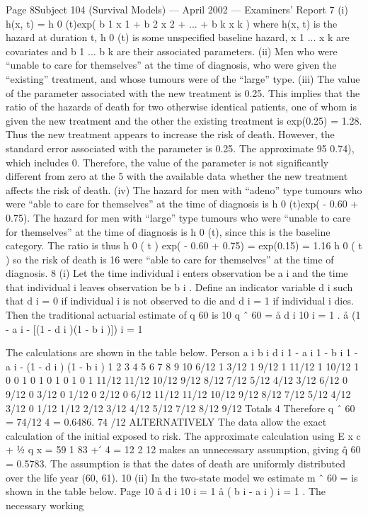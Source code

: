 \documentclass[a4paper,12pt]{article}
\begin{document}
\begin{enumerate}
Page 8Subject 104 (Survival Models) — April 2002 — Examiners’ Report
7
(i) h(x, t) = h 0 (t)exp( b 1 x 1 + b 2 x 2 + ... + b k x k )
where h(x, t) is the hazard at duration t, h 0 (t) is some unspecified baseline
hazard, x 1 ... x k are covariates and b 1 ... b k are their associated parameters.
(ii) Men who were “unable to care for themselves” at the time of diagnosis, who
were given the “existing” treatment, and whose tumours were of the “large”
type.
(iii) The value of the parameter associated with the new treatment is 0.25. This
implies that the ratio of the hazards of death for two otherwise identical
patients, one of whom is given the new treatment and the other the existing
treatment is exp(0.25) = 1.28. Thus the new treatment appears to increase the
risk of death.
However, the standard error associated with the parameter is 0.25. The
approximate 95%
0.74), which includes 0. Therefore, the value of the parameter is not
significantly different from zero at the 5%
with the available data whether the new treatment affects the risk of death.
(iv)
The hazard for men with “adeno” type tumours who were “able to care for
themselves” at the time of diagnosis is h 0 (t)exp( - 0.60 + 0.75).
The hazard for men with “large” type tumours who were “unable to care for
themselves” at the time of diagnosis is h 0 (t), since this is the baseline category.
The ratio is thus
h 0 ( t ) exp( - 0.60 + 0.75)
= exp(0.15) = 1.16
h 0 ( t )
so the risk of death is 16%
were “able to care for themselves” at the time of diagnosis.
8
(i)
Let the time individual i enters observation be a i and the time that individual i
leaves observation be b i . Define an indicator variable d i such that d i = 0 if individual i is not observed to die and d i = 1 if individual i dies. Then the
traditional actuarial estimate of q 60 is
10
q ˆ 60 =
å d i
10
i = 1
.
å (1 - a i - [(1 - d i )(1 - b i )])
i = 1

The calculations are shown in the table below.
Person a i b i d i 1 - a i 1 - b i 1 - a i - (1 - d i ) (1 - b i )
1
2
3
4
5
6
7
8
9
10 6/12
1
3/12
1
9/12
1
11/12
1
10/12
1 0
0
1
0
1
0
1
0
1
0 1
11/12
11/12
10/12
9/12
8/12
7/12
5/12
4/12
3/12 6/12
0
9/12
0
3/12
0
1/12
0
2/12
0 6/12
11/12
11/12
10/12
9/12
8/12
7/12
5/12
4/12
3/12
0
1/12
1/12
2/12
3/12
4/12
5/12
7/12
8/12
9/12
Totals
4
Therefore q ˆ 60 =
74/12
4
= 0.6486.
74 /12
ALTERNATIVELY
The data allow the exact calculation of the initial exposed to risk. The
approximate calculation using
E x c + 1⁄2 q x =
59 1
83
+  ́ 4 =
12 2
12
makes an unnecessary assumption, giving q̂ 60 = 0.5783.
The assumption is that the dates of death are uniformly distributed over the
life year (60, 61).
10
(ii)
In the two-state model we estimate m ˆ 60 =
is shown in the table below.
Page 10
å d i
10
i = 1
å ( b i - a i )
i = 1
. The necessary working


\end{enumerate}
\end{document}
